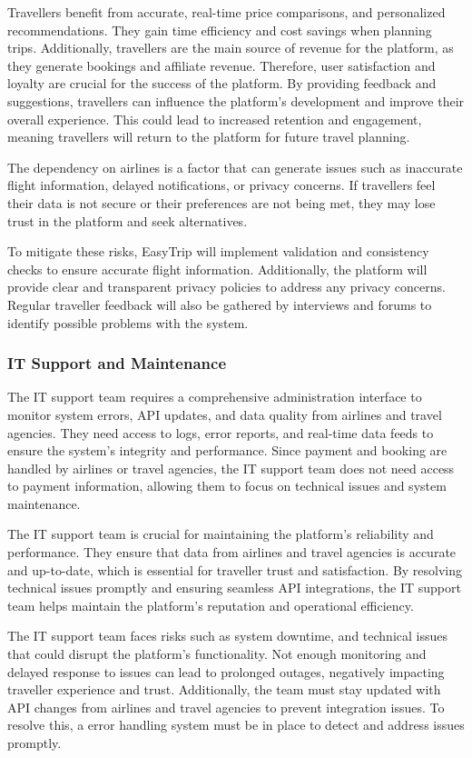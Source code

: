 Travellers benefit from accurate, real-time price comparisons, and personalized recommendations. They gain time efficiency and cost savings when planning trips. Additionally, travellers are the main source of revenue for the platform, as they generate bookings and affiliate revenue. Therefore, user satisfaction and loyalty are crucial for the success of the platform. By providing feedback and suggestions, travellers can influence the platform's development and improve their overall experience. This could lead to increased retention and engagement, meaning travellers will return to the platform for future travel planning.


The dependency on airlines is a factor that can generate issues such as inaccurate flight information, delayed notifications, or privacy concerns. If travellers feel their data is not secure or their preferences are not being met, they may lose trust in the platform and seek alternatives.

To mitigate these risks, EasyTrip will implement validation and consistency checks to ensure accurate flight information. Additionally, the platform will provide clear and transparent privacy policies to address any privacy concerns. Regular traveller feedback will also be gathered by interviews and forums to identify possible problems with the system. 

\subsubsection{IT Support and Maintenance}
The IT support team requires a comprehensive administration interface to monitor system errors, API updates, and data quality from airlines and travel agencies. They need access to logs, error reports, and real-time data feeds to ensure the system's integrity and performance. Since payment and booking are handled by airlines or travel agencies, the IT support team does not need access to payment information, allowing them to focus on technical issues and system maintenance.


The IT support team is crucial for maintaining the platform's reliability and performance. They ensure that data from airlines and travel agencies is accurate and up-to-date, which is essential for traveller trust and satisfaction. By resolving technical issues promptly and ensuring seamless API integrations, the IT support team helps maintain the platform's reputation and operational efficiency.


The IT support team faces risks such as system downtime, and technical issues that could disrupt the platform's functionality. Not enough monitoring and delayed response to issues can lead to prolonged outages, negatively impacting traveller experience and trust. Additionally, the team must stay updated with API changes from airlines and travel agencies to prevent integration issues. To resolve this, a error handling system must be in place to detect and address issues promptly.


